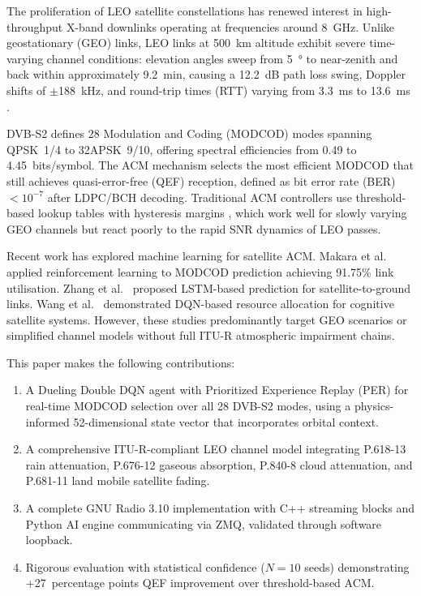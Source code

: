 \documentclass[conference]{IEEEtran}
\begin{document}
The proliferation of LEO satellite constellations has renewed interest in high-throughput X-band downlinks operating at frequencies around \SI{8}{\giga\hertz}. Unlike geostationary (GEO) links, LEO links at \SI{500}{\kilo\metre} altitude exhibit severe time-varying channel conditions: elevation angles sweep from \SI{5}{\degree} to near-zenith and back within approximately \SI{9.2}{\minute}, causing a \SI{12.2}{\deci\bel} path loss swing, Doppler shifts of $\pm$\SI{188}{\kilo\hertz}, and round-trip times (RTT) varying from \SI{3.3}{\milli\second} to \SI{13.6}{\milli\second} \cite{delperal2021,3gpp_tr38811}.

DVB-S2 \cite{etsi_dvbs2} defines 28 Modulation and Coding (MODCOD) modes spanning QPSK~1/4 to 32APSK~9/10, offering spectral efficiencies from 0.49 to 4.45~bits/symbol. The ACM mechanism selects the most efficient MODCOD that still achieves quasi-error-free (QEF) reception, defined as bit error rate (BER) $< 10^{-7}$ after LDPC/BCH decoding. Traditional ACM controllers use threshold-based lookup tables with hysteresis margins \cite{bischl2010,rinaldo2004}, which work well for slowly varying GEO channels but react poorly to the rapid SNR dynamics of LEO passes.

Recent work has explored machine learning for satellite ACM. Makara et al.\ \cite{makara2024} applied reinforcement learning to MODCOD prediction achieving 91.75\% link utilisation. Zhang et al.\ \cite{zhang2022} proposed LSTM-based prediction for satellite-to-ground links. Wang et al.\ \cite{wang2019wcnc} demonstrated DQN-based resource allocation for cognitive satellite systems. However, these studies predominantly target GEO scenarios or simplified channel models without full ITU-R atmospheric impairment chains.

This paper makes the following contributions:
\begin{enumerate}
\item A Dueling Double DQN agent with Prioritized Experience Replay (PER) for real-time MODCOD selection over all 28 DVB-S2 modes, using a physics-informed 52-dimensional state vector that incorporates orbital context.
\item A comprehensive ITU-R-compliant LEO channel model integrating P.618-13 rain attenuation, P.676-12 gaseous absorption, P.840-8 cloud attenuation, and P.681-11 land mobile satellite fading.
\item A complete GNU Radio 3.10 implementation with C++ streaming blocks and Python AI engine communicating via ZMQ, validated through software loopback.
\item Rigorous evaluation with statistical confidence ($N{=}10$ seeds) demonstrating +27~percentage points QEF improvement over threshold-based ACM.
\end{enumerate}
\end{document}

